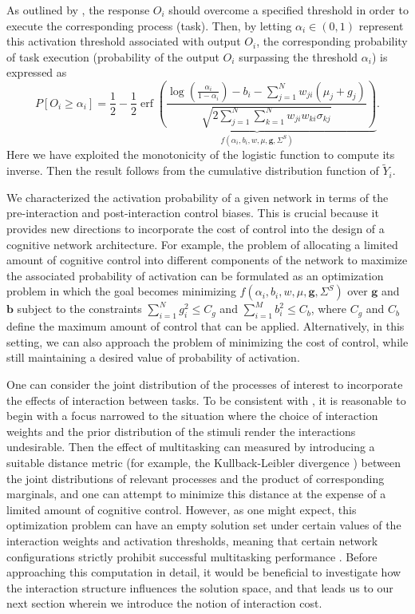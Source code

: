 \documentclass[10pt,letterpaper]{article}
\DeclareMathOperator{\erf}{erf}
\begin{document}
As outlined by , the response $O_i$ should overcome a specified threshold in order to execute the corresponding process (task). Then, by letting $\alpha_i \in (0,1)$ represent this activation threshold associated with output $O_i$, the corresponding probability of task execution (probability of the output $O_i$ surpassing the threshold $\alpha_i$) is expressed as
\begin{displaymath}
P[O_i \geq \alpha_i] = \frac{1}{2} - \frac{1}{2}\underbrace{\erf\left(\frac{\log\left(\frac{\alpha_i}{1-\alpha_i}\right) - b_i - \sum\limits_{j=1}^N w_{ji}(\mu_j + g_j)}{\sqrt{2\sum\limits_{j=1}^N \sum\limits_{k=1}^N w_{ji}w_{ki}\sigma_{kj}}}\right)}_{f(\alpha_i, b_i, w, \mu, \mathbf{g}, \Sigma^S)}.
\end{displaymath}
Here we have exploited the monotonicity of the logistic function to compute its inverse. Then the result follows from the cumulative distribution function of $\tilde{Y}_i$.

We characterized the activation probability of a given network in terms of the pre-interaction and post-interaction control biases. This is crucial because it provides new directions to incorporate the cost of control into the design of a cognitive network architecture. For example, the problem of allocating a limited amount of cognitive control into different components of the network to maximize the associated probability of activation can be formulated as an optimization problem in which the goal becomes minimizing $f(\alpha_i, b_i, w, \mu, \mathbf{g}, \Sigma^S)$ over $\mathbf{g}$ and $\mathbf{b}$ subject to the constraints $\sum\limits_{i=1}^N g^2_i \leq C_g$ and $\sum\limits_{i=1}^M b^2_i \leq C_b$, where $C_g$ and $C_b$ define the maximum amount of control that can be applied. Alternatively, in this setting, we can also approach the problem of minimizing the cost of control, while still maintaining a desired value of probability of activation.

One can consider the joint distribution of the processes of interest to incorporate the effects of interaction between tasks. To be consistent with \cite{Feng_et_al_2014, CogSci_2016}, it is reasonable to begin with a focus narrowed to the situation where the choice of interaction weights and the prior distribution of the stimuli render the interactions undesirable. Then the effect of multitasking can measured by introducing a suitable distance metric (for example, the Kullback-Leibler divergence \cite{ortega2013thermodynamics}) between the joint distributions of relevant processes and the product of corresponding marginals, and one can attempt to minimize this distance at the expense of a limited amount of cognitive control. However, as one might expect, this optimization problem can have an empty solution set under certain values of the interaction weights and activation thresholds, meaning that certain network configurations strictly prohibit successful multitasking performance \cite{CogSci_2016}. Before approaching this computation in detail, it would be beneficial to investigate how the interaction structure influences the solution space, and that leads us to our next section wherein we introduce the notion of interaction cost.
%
%
%
\end{document}
